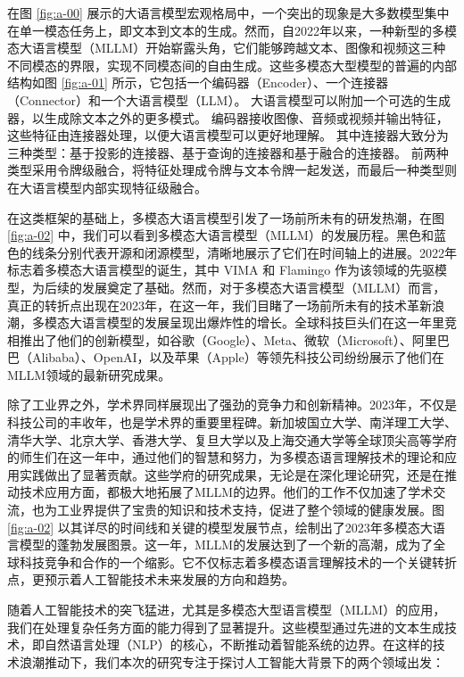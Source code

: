 在图 \ref{fig:a-00} 展示的大语言模型宏观格局中，一个突出的现象是大多数模型集中在单一模态任务上，即文本到文本的生成。然而，自2022年以来，一种新型的多模态大语言模型（MLLM）开始崭露头角，它们能够跨越文本、图像和视频这三种不同模态的界限，实现不同模态间的自由生成。这些多模态大型模型的普遍的内部结构如图 \ref{fig:a-01} 所示\cite{yin2024survey}，它包括一个编码器（Encoder）、一个连接器（Connector）和一个大语言模型（LLM）。 大语言模型可以附加一个可选的生成器，以生成除文本之外的更多模式。 编码器接收图像、音频或视频并输出特征，这些特征由连接器处理，以便大语言模型可以更好地理解。 其中连接器大致分为三种类型：基于投影的连接器、基于查询的连接器和基于融合的连接器。 前两种类型采用令牌级融合，将特征处理成令牌与文本令牌一起发送，而最后一种类型则在大语言模型内部实现特征级融合。

在这类框架的基础上，多模态大语言模型引发了一场前所未有的研发热潮，在图 \ref{fig:a-02} 中，我们可以看到多模态大语言模型（MLLM）的发展历程。黑色和蓝色的线条分别代表开源和闭源模型，清晰地展示了它们在时间轴上的进展。2022年标志着多模态大语言模型的诞生，其中 VIMA 和 Flamingo 作为该领域的先驱模型，为后续的发展奠定了基础。然而，对于多模态大语言模型（MLLM）而言，真正的转折点出现在2023年，在这一年，我们目睹了一场前所未有的技术革新浪潮，多模态大语言模型的发展呈现出爆炸性的增长。全球科技巨头们在这一年里竞相推出了他们的创新模型，如谷歌（Google）、Meta、微软（Microsoft）、阿里巴巴（Alibaba）、OpenAI，以及苹果（Apple）等领先科技公司纷纷展示了他们在MLLM领域的最新研究成果。

除了工业界之外，学术界同样展现出了强劲的竞争力和创新精神。2023年，不仅是科技公司的丰收年，也是学术界的重要里程碑。新加坡国立大学、南洋理工大学、清华大学、北京大学、香港大学、复旦大学以及上海交通大学等全球顶尖高等学府的师生们在这一年中，通过他们的智慧和努力，为多模态语言理解技术的理论和应用实践做出了显著贡献。这些学府的研究成果，无论是在深化理论研究，还是在推动技术应用方面，都极大地拓展了MLLM的边界。他们的工作不仅加速了学术交流，也为工业界提供了宝贵的知识和技术支持，促进了整个领域的健康发展。图 \ref{fig:a-02} 以其详尽的时间线和关键的模型发展节点，绘制出了2023年多模态大语言模型的蓬勃发展图景。这一年，MLLM的发展达到了一个新的高潮，成为了全球科技竞争和合作的一个缩影。它不仅标志着多模态语言理解技术的一个关键转折点，更预示着人工智能技术未来发展的方向和趋势。

随着人工智能技术的突飞猛进，尤其是多模态大型语言模型（MLLM）的应用，我们在处理复杂任务方面的能力得到了显著提升。这些模型通过先进的文本生成技术，即自然语言处理（NLP）的核心，不断推动着智能系统的边界。在这样的技术浪潮推动下，我们本次的研究专注于探讨人工智能大背景下的两个领域出发：

